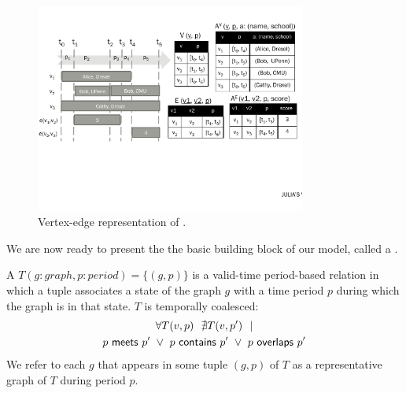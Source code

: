 \begin{figure}
\centering
\includegraphics[width=3.5in]{figs/T1_rel_tab.pdf}
\caption{Vertex-edge representation of \tg {}.}
\label{fig:tg_ve}
\end{figure}



We are now ready to present the the basic building block of our model,
called a \tg.

\begin{definition}[TGraph]
A \tg $T(g:graph, p:period) = \{ (g,p) \}$ is a valid-time
period-based relation in which a tuple associates a state of the graph
$g$ with a time period $p$ during which the graph is in that state.
$T$ is temporally coalesced:
\begin{multline}
\forall T(v,p)~~\nexists T(v,p')~~| \\
        p~\mathsf{meets}~p'~\lor~p~\mathsf{contains}~p'~\lor~p~\mathsf{overlaps}~p'
\end{multline}
We refer to each $g$ that appears in some tuple $(g,p)$ of $T$ as a
representative graph of $T$ during period $p$.

\label{def:tg_abstract}
\end{definition}

